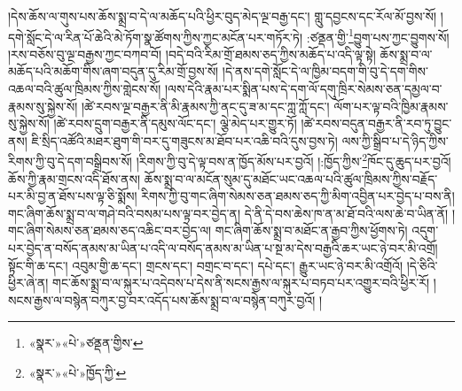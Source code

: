 །དེས་ཆོས་ལ་གུས་པས་ཆོས་སྨྲ་བ་དེ་ལ་མཆོད་པའི་ཕྱིར་བུད་མེད་ལྔ་བརྒྱ་དང་། གླུ་དབྱངས་དང་རོལ་མོ་བྱས་སོ། །དགེ་སློང་དེ་ལ་རིན་པོ་ཆེའི་མེ་ཏོག་སྣ་ཚོགས་ཀྱིས་ཀྱང་མངོན་པར་གཏོར་ཏེ། :ཙནྡན་གྱི་\footnote{«སྣར་»«པེ་»ཙནྡན་གྱིས་}བྱུག་པས་ཀྱང་བྱུགས་སོ། །རས་བཅོས་བུ་ལྔ་བརྒྱས་ཀྱང་བཀབ་བོ། །བདེ་བའི་རིམ་གྲོ་ཐམས་ཅད་ཀྱིས་མཆོད་པ་འདི་ལྟ་སྟེ། ཆོས་སྨྲ་བ་ལ་མཆོད་པའི་མཆོག་གིས་ཞག་བདུན་དུ་རིམ་གྲོ་བྱས་སོ། །དེ་ནས་དགེ་སློང་དེ་ལ་ཁྱིམ་བདག་གི་བུ་དེ་དག་གིས་འཆལ་བའི་ཚུལ་ཁྲིམས་ཀྱིས་གླེངས་སོ། །ལས་དེའི་རྣམ་པར་སྨིན་པས་དེ་དག་ལོ་དགུ་ཁྲིར་སེམས་ཅན་དམྱལ་བ་རྣམས་སུ་སྐྱེས་སོ། །ཚེ་རབས་ལྔ་བརྒྱར་ནི་མི་རྣམས་ཀྱི་ནང་དུ་ཟ་མ་དང་ཀླ་ཀློ་དང་། ལོག་པར་ལྟ་བའི་ཁྱིམ་རྣམས་སུ་སྐྱེས་སོ། །ཚེ་རབས་དྲུག་བརྒྱར་ནི་དམུས་ལོང་དང་། ལྕེ་མེད་པར་གྱུར་ཏོ། །ཚེ་རབས་བདུན་བརྒྱར་ནི་རབ་ཏུ་བྱུང་ནས། ཇི་སྲིད་འཚོའི་མཐར་ཐུག་གི་བར་དུ་གཟུངས་མ་ཐོབ་པར་འཆི་བའི་དུས་བྱས་ཏེ། ལས་ཀྱི་སྒྲིབ་པ་དེ་ཉིད་ཀྱིས་རིགས་ཀྱི་བུ་དེ་དག་བསྒྲིབས་སོ། །རིགས་ཀྱི་བུ་དེ་ལྟ་བས་ན་ཁྱོད་མོས་པར་བྱའོ། །:ཁྱོད་ཀྱིས་\footnote{«སྣར་»«པེ་»ཁྱོད་ཀྱི་}ཁོང་དུ་ཆུད་པར་བྱའོ། ཆོས་ཀྱི་རྣམ་གྲངས་འདི་ཐོས་ནས། ཆོས་སྨྲ་བ་ལ་མངོན་སུམ་དུ་མཐོང་ཡང་འཆལ་པའི་ཚུལ་ཁྲིམས་ཀྱིས་བརྗོད་པར་མི་བྱ་ན་ཐོས་པས་ལྟ་ཅི་སྨོས། རིགས་ཀྱི་བུ་གང་ཞིག་སེམས་ཅན་ཐམས་ཅད་ཀྱི་མིག་འབྱིན་པར་བྱེད་པ་བས་ནི། གང་ཞིག་ཆོས་སྨྲ་བ་ལ་གཤེ་བའི་བསམ་པས་ལྟ་བར་བྱེད་ན། དེ་ནི་དེ་བས་ཆེས་ཁ་ན་མ་ཐོ་བའི་ལས་ཆེ་བ་ཡིན་ནོ། །གང་ཞིག་སེམས་ཅན་ཐམས་ཅད་འཆིང་བར་བྱེད་ལ། གང་ཞིག་ཆོས་སྨྲ་བ་མཐོང་ན་རྒྱབ་ཀྱིས་ཕྱོགས་ཏེ། འདུག་པར་བྱེད་ན་བསོད་ནམས་མ་ཡིན་པ་འདི་ལ་བསོད་ནམས་མ་ཡིན་པ་སྔ་མ་དེས་བརྒྱའི་ཆར་ཡང་ཉེ་བར་མི་འགྲོ། སྟོང་གི་ཆ་དང་། འབུམ་གྱི་ཆ་དང་། གྲངས་དང་། བགྲང་བ་དང་། དཔེ་དང་། རྒྱུར་ཡང་ཉེ་བར་མི་འགྲོའོ། །དེ་ཅིའི་ཕྱིར་ཞེ་ན། གང་ཆོས་སྨྲ་བ་ལ་སྐུར་པ་འདེབས་པ་དེས་ནི་སངས་རྒྱས་ལ་སྐུར་པ་བཏབ་པར་འགྱུར་བའི་ཕྱིར་རོ། །སངས་རྒྱས་ལ་བསྙེན་བཀུར་བྱ་བར་འདོད་པས་ཆོས་སྨྲ་བ་ལ་བསྙེན་བཀུར་བྱའོ། །
